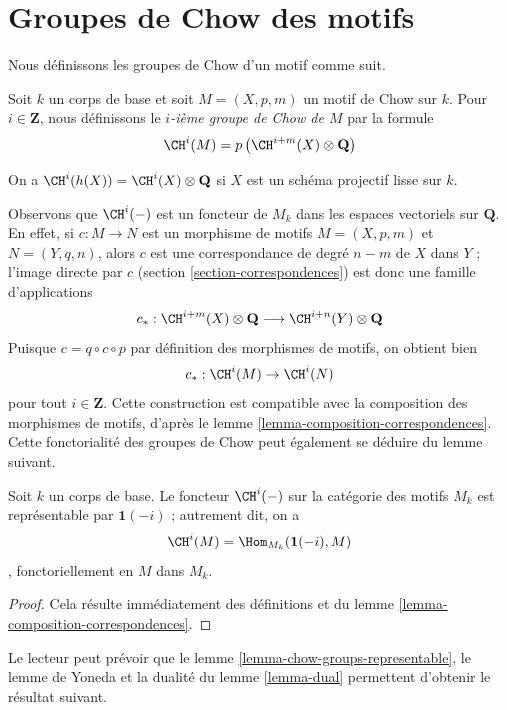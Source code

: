 \section{Groupes de Chow des motifs}
\label{section-chow-groups-motives}

\noindent
Nous définissons les groupes de Chow d'un motif comme suit.

\begin{definition}
\label{definition-chow-group-motives}
Soit $k$ un corps de base et soit $M = (X, p, m)$ un motif de Chow sur $k$.
Pour $i \in \mathbf{Z}$, nous définissons le {\it $i$-ième groupe de Chow de $M$}
par la formule
$$
\CH^i(M) = p\left(\CH^{i + m}(X) \otimes \mathbf{Q}\right)
$$
\end{definition}

\noindent
On a $\CH^i(h(X)) = \CH^i(X) \otimes \mathbf{Q}$
si $X$ est un schéma projectif lisse sur $k$.

\medskip\noindent
Observons que $\CH^i(-)$ est un foncteur de $M_k$ dans les espaces vectoriels sur $\mathbf{Q}$.
En effet, si $c : M \to N$ est un morphisme de motifs
$M = (X, p, m)$ et $N = (Y, q, n)$, alors $c$ est une correspondance de
degré $n - m$ de $X$ dans $Y$ ; l'image directe par $c$
(section \ref{section-correspondences}) est donc une famille d'applications
$$
c_* :
\CH^{i + m}(X) \otimes \mathbf{Q}
\longrightarrow
\CH^{i + n}(Y) \otimes \mathbf{Q}
$$
Puisque $c = q \circ c \circ p$ par définition des morphismes de motifs,
on obtient bien
$$
c_* : \CH^i(M) \to \CH^i(N)
$$
pour tout $i \in \mathbf{Z}$. Cette construction est compatible avec la composition des
morphismes de motifs, d'après le lemme \ref{lemma-composition-correspondences}.
Cette fonctorialité des groupes de Chow peut également se déduire
du lemme suivant.

\begin{lemma}
\label{lemma-chow-groups-representable}
Soit $k$ un corps de base. Le foncteur $\CH^i(-)$ sur la catégorie
des motifs $M_k$ est représentable par $\mathbf{1}(-i)$ ; autrement dit,
on a
$$
\CH^i(M) = \Hom_{M_k}(\mathbf{1}(-i), M)
$$,
fonctoriellement en $M$ dans $M_k$.
\end{lemma}

\begin{proof}
Cela résulte immédiatement des définitions et du
lemme \ref{lemma-composition-correspondences}.
\end{proof}

\noindent
Le lecteur peut prévoir que le
lemme \ref{lemma-chow-groups-representable}, le lemme de Yoneda et
la dualité du lemme \ref{lemma-dual} permettent d'obtenir le résultat suivant.


